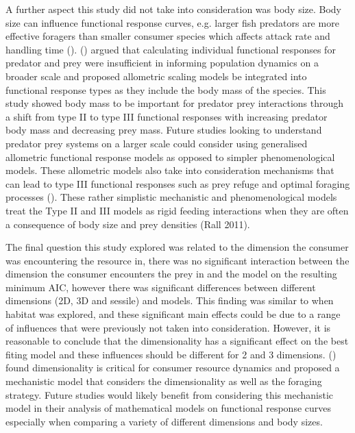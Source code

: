 \documentclass[11pt]{article}
\begin{document}
A further aspect this study did not take into consideration was body size. Body size can influence functional response curves, e.g. larger fish predators are more effective foragers than smaller consumer species which affects attack rate and handling time (\cite{Dunn2020}). (\cite{Kalinkat2013}) argued that calculating individual functional responses for predator and prey were insufficient in informing population dynamics on a broader scale and proposed allometric scaling models be integrated into functional response types as they include the body mass of the species. This study showed body mass to be important for predator prey interactions through a shift from type II to type III functional responses with increasing predator body mass and decreasing prey mass. Future studies looking to understand predator prey systems on a larger scale could consider using generalised allometric functional response models as opposed to simpler phenomenological models. These allometric models also take into consideration mechanisms that can lead to type III functional responses such as prey refuge and optimal foraging processes (\cite{Murdoch1975}). These rather simplistic mechanistic and phenomenological models treat the Type II and III models as rigid feeding interactions when they are often a consequence of body size and prey densities (Rall 2011).

The final question this study explored was related to the dimension the consumer was encountering the resource in, there was no significant interaction between the dimension the consumer encounters the prey in and the model on the resulting minimum AIC, however there was significant differences between different dimensions (2D, 3D and sessile) and models. This finding was similar to when habitat was explored, and these significant main effects could be due to a range of influences that were previously not taken into consideration. However, it is reasonable to conclude that the dimensionality has a significant effect on the best fiting model and these influences should be different for 2 and 3 dimensions. (\cite{Pawar2012}) found dimensionality is critical for consumer resource dynamics and proposed a mechanistic model that considers the dimensionality as well as the foraging strategy. Future studies would likely benefit from considering this mechanistic model in their analysis of mathematical models on functional response curves especially when comparing a variety of different dimensions and body sizes. 
\end{document}
